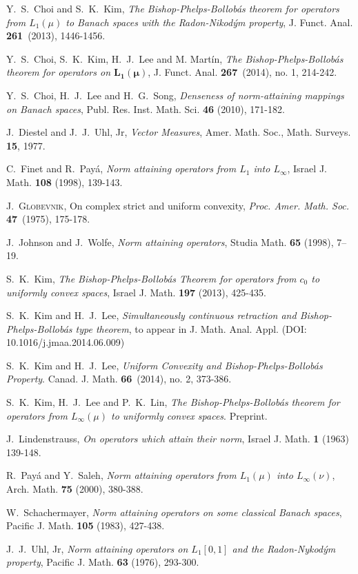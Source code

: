 \documentclass[a4paper]{amsart}
\theoremstyle{plain}
\theoremstyle{definition}
\begin{document}
\begin{thebibliography}{99}
 Y.~S.~Choi and S.~K.~Kim, \emph{The Bishop-Phelps-Bollob\'as theorem for operators from $L_1(\mu)$ to Banach spaces with the Radon-Nikod\'ym property}, J. Funct. Anal. {\bf 261}~(2013), 1446-1456.

 Y.~S.~Choi, S.~K.~Kim, H.~J.~Lee and M. Mart\'in, \emph{The Bishop-Phelps-Bollob\'{a}s theorem for operators on $\boldsymbol{L_1(\mu)}$}, J. Funct. Anal. {\bf 267}~(2014), no. 1, 214-242.

Y.~S.~Choi, H.~J.~Lee and H.~G.~Song, \emph{Denseness of norm-attaining mappings on {B}anach spaces}, Publ. Res. Inst. Math. Sci.
 {\bf 46} (2010), 171-182.

 J.~Diestel and J.~J.~Uhl, Jr, \emph{Vector Measures}, Amer. Math. Soc., Math. Surveys. {\bf 15}, 1977.

 C.~Finet and R.~Pay\'{a}, \emph{Norm attaining operators from $L_1$ into $L_{\infty}$}, Israel J. Math. {\bf 108} (1998), 139-143.

 \textsc{J.~Globevnik}, {On complex strict and uniform convexity,} \emph{Proc. Amer. Math. Soc.}  {\bf 47}~(1975), 175-178.

J.~Johnson and J.~Wolfe, \emph{Norm attaining operators}, Studia Math. {\bf 65} (1998), 7--19.

S.~K.~Kim, {\it The Bishop-Phelps-Bollob\'as Theorem for operators from $c_0$ to
uniformly convex spaces}, Israel J. Math. {\bf 197} (2013), 425-435.

S.~K.~Kim and H.~J.~Lee, \textit{Simultaneously continuous retraction and Bishop-Phelps-Bollob\'as type theorem}, to appear in J. Math. Anal. Appl. (DOI: 10.1016/j.jmaa.2014.06.009)

 S.~K.~Kim and H.~J.~Lee, \emph{Uniform Convexity and Bishop-Phelps-Bollob\'as Property}. Canad. J. Math. {\bf 66}~(2014), no. 2, 373-386.

S.~K.~Kim, H.~J.~Lee and P.~K.~Lin,  \textit{The Bishop-Phelps-Bollob\'as theorem for operators from $L_\infty(\mu)$ to uniformly convex spaces}. Preprint.

 J.~Lindenstrauss, \emph{On operators which attain their norm}, Israel J. Math. {\bf 1} (1963) 139-148.

 R.~Pay\'{a} and Y.~Saleh, \emph{Norm attaining operators from $L_1(\mu)$ into $L_{\infty}(\nu)$}, Arch. Math. {\bf 75} (2000), 380-388.

 W.~Schachermayer, \emph{Norm attaining operators on some classical Banach spaces}, Pacific J. Math. {\bf 105} (1983), 427-438.

 J.~J.~Uhl, Jr, \emph{Norm attaining operators on $L_1[0,1]$ and the Radon-Nykod\'ym property}, Pacific J. Math. {\bf 63} (1976), 293-300.

\end{thebibliography}
\end{document}
